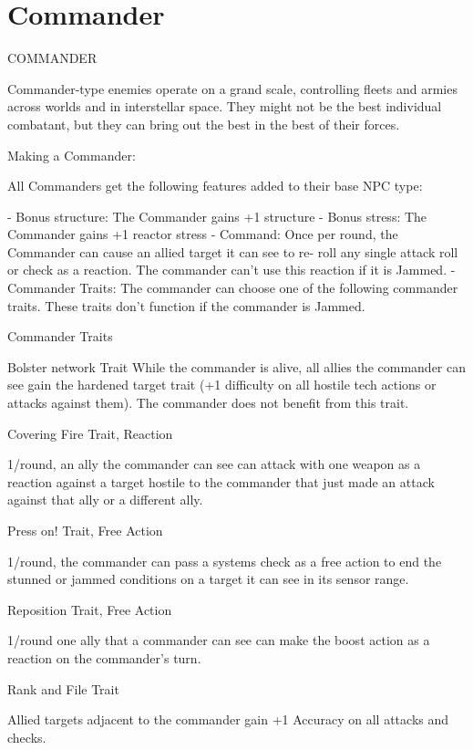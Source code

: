 \section{Commander}
                                              COMMANDER

Commander-type enemies operate on a grand scale, controlling fleets and armies across worlds
and in interstellar space. They might not be the best individual combatant, but they can bring out
the best in the best of their forces.

Making a Commander:

All Commanders get the following features added to their base NPC type:

    -    Bonus structure: The Commander gains +1 structure
    -    Bonus stress: The Commander gains +1 reactor stress
    -    Command: Once per round, the Commander can cause an allied target it can see to re-
         roll any single attack roll or check as a reaction. The commander can’t use this reaction if
         it is Jammed.
    -    Commander Traits: The commander can choose one of the following commander traits.
         These traits don’t function if the commander is Jammed.

Commander Traits

Bolster network
Trait
While the commander is alive, all allies the commander can see gain the hardened target trait (+1
difficulty on all hostile tech actions or attacks against them). The commander does not benefit
from this trait.


Covering Fire
Trait, Reaction

1/round, an ally the commander can see can attack with one weapon as a reaction against a
target hostile to the commander that just made an attack against that ally or a different ally.


Press on!
Trait, Free Action

1/round, the commander can pass a systems check as a free action to end the stunned or
jammed conditions on a target it can see in its sensor range.


Reposition
Trait, Free Action

1/round one ally that a commander can see can make the boost action as a reaction on the
commander’s turn.


Rank and File
Trait

Allied targets adjacent to the commander gain +1 Accuracy on all attacks and checks.
